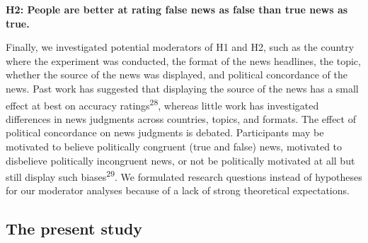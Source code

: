\documentclass[
  doc,floatsintext]{apa6}
\begin{document}
\textbf{H2: People are better at rating false news as false than true news as true.}

Finally, we investigated potential moderators of H1 and H2, such as the country where the experiment was conducted, the format of the news headlines, the topic, whether the source of the news was displayed, and political concordance of the news. Past work has suggested that displaying the source of the news has a small effect at best on accuracy ratings\textsuperscript{28}, whereas little work has investigated differences in news judgments across countries, topics, and formats. The effect of political concordance on news judgments is debated. Participants may be motivated to believe politically congruent (true and false) news, motivated to disbelieve politically incongruent news, or not be politically motivated at all but still display such biases\textsuperscript{29}. We formulated research questions instead of hypotheses for our moderator analyses because of a lack of strong theoretical expectations.

\subsection{The present study}\label{the-present-study}
\end{document}
